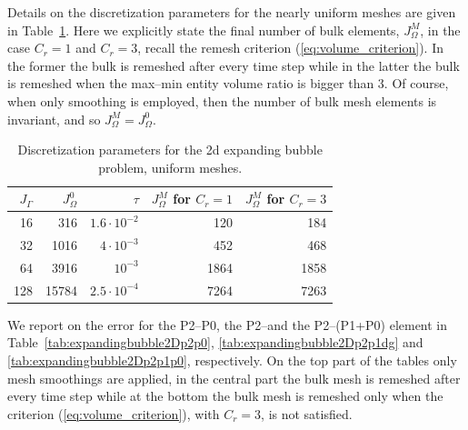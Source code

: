 Details on the discretization parameters for the nearly uniform meshes are
given in Table~\ref{tab:expandingbubble2Delements}. Here we explicitly
state the final number of bulk elements, $J_\Omega^M$, in the case $C_r = 1$
and $C_r = 3$, recall the remesh criterion (\ref{eq:volume_criterion}). In the
former the bulk is remeshed after every time step while in the latter the bulk
is remeshed when the max--min entity volume ratio is bigger than 3. Of course,
when only smoothing is employed, then the number of bulk mesh elements is
invariant, and so $J_\Omega^M = J_\Omega^0$.
\begin{table}
\center
\begin{tabular}{rrrrr}
\hline
$J_\Gamma$ & $J_\Omega^0$ & $\tau$ & $J_\Omega^M$ for $C_r=1$ &
$J_\Omega^M$ for $C_r=3$ \\
\hline
 16 &   316 & $1.6\cdot10^{-2}$ &  120 &  184 \\
 32 &  1016 &   $4\cdot10^{-3}$ &  452 &  468 \\
 64 &  3916 &         $10^{-3}$ & 1864 & 1858 \\
128 & 15784 & $2.5\cdot10^{-4}$ & 7264 & 7263 \\
\hline
\end{tabular}
\caption[Stokes expanding bubble uniform meshes parameters]
{Discretization parameters for the 2d expanding bubble problem, uniform meshes.}
\label{tab:expandingbubble2Delements}
\end{table}
We report on the error for the P2--P0, the P2--\pdg and the P2--(P1+P0)
element in Table~\ref{tab:expandingbubble2Dp2p0},
\ref{tab:expandingbubble2Dp2p1dg} and \ref{tab:expandingbubble2Dp2p1p0},
respectively. On the top part of the tables only mesh smoothings are applied,
in the central part the bulk mesh is remeshed after every time step while at
the bottom the bulk mesh is remeshed only when the criterion
(\ref{eq:volume_criterion}), with $C_r=3$, is not satisfied.
